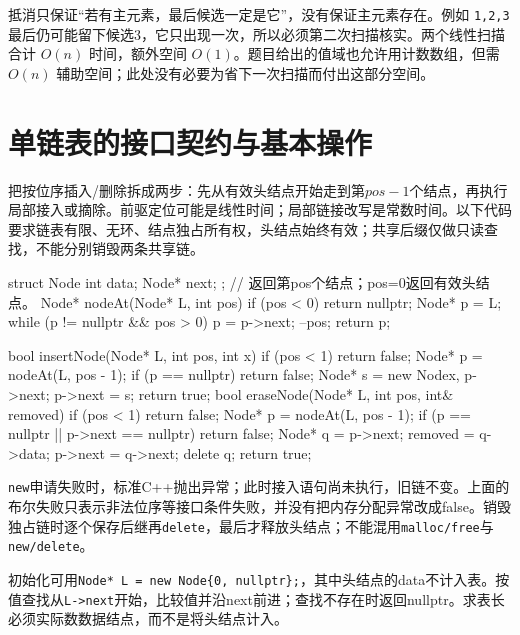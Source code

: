 抵消只保证``若有主元素，最后候选一定是它''，没有保证主元素存在。例如 \texttt{1,\allowbreak{}2,\allowbreak{}3} 最后仍可能留下候选3，它只出现一次，所以必须第二次扫描核实。两个线性扫描合计 \(O(n)\) 时间，额外空间 \(O(1)\)。题目给出的值域也允许用计数数组，但需 \(O(n)\) 辅助空间；此处没有必要为省下一次扫描而付出这部分空间。

\section{单链表的接口契约与基本操作}\label{DS02-code-link}

\begin{methodbox}

把按位序插入/删除拆成两步：先从有效头结点开始走到第\(pos-1\)个结点，再执行局部接入或摘除。前驱定位可能是线性时间；局部链接改写是常数时间。以下代码要求链表有限、无环、结点独占所有权，头结点始终有效；共享后缀仅做只读查找，不能分别销毁两条共享链。

\end{methodbox}

\begin{codeblock}[language=C++]
struct Node { int data; Node* next; };
// 返回第pos个结点；pos=0返回有效头结点。
Node* nodeAt(Node* L, int pos) {
    if (pos < 0) return nullptr;
    Node* p = L;
    while (p != nullptr && pos > 0) {
        p = p->next;
        --pos;
    }
    return p;
}
\end{codeblock}

\begin{codeblock}[language=C++]
bool insertNode(Node* L, int pos, int x) {
    if (pos < 1) return false;
    Node* p = nodeAt(L, pos - 1);
    if (p == nullptr) return false;
    Node* s = new Node{x, p->next};
    p->next = s;
    return true;
}
bool eraseNode(Node* L, int pos, int& removed) {
    if (pos < 1) return false;
    Node* p = nodeAt(L, pos - 1);
    if (p == nullptr || p->next == nullptr) return false;
    Node* q = p->next;
    removed = q->data;
    p->next = q->next;
    delete q;
    return true;
}
\end{codeblock}

\texttt{new}申请失败时，标准C++抛出异常；此时接入语句尚未执行，旧链不变。上面的布尔失败只表示非法位序等接口条件失败，并没有把内存分配异常改成false。销毁独占链时逐个保存后继再\texttt{delete}，最后才释放头结点；不能混用\texttt{malloc/\allowbreak{}free}与\texttt{new/\allowbreak{}delete}。

初始化可用\texttt{Node*\allowbreak{} L =\allowbreak{} new Node\{0,\allowbreak{} nullptr\};\allowbreak{}}，其中头结点的data不计入表。按值查找从\texttt{L->\allowbreak{}next}开始，比较值并沿next前进；查找不存在时返回nullptr。求表长必须实际数数据结点，而不是将头结点计入。

